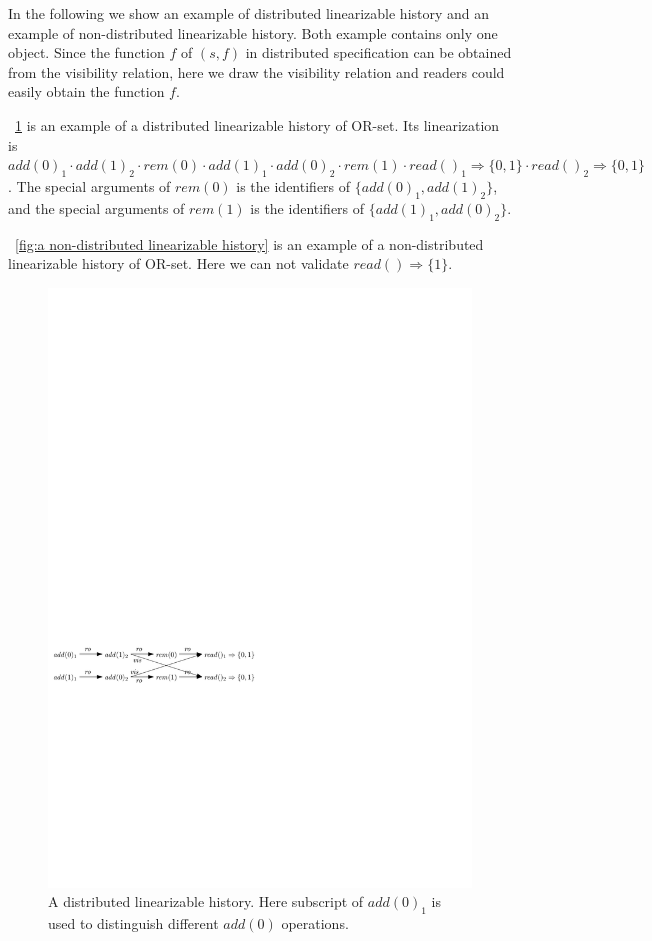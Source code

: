 
In the following we show an example of distributed linearizable history and an example of non-distributed linearizable history. Both example contains only one object. Since the function $f$ of $(s,f)$ in distributed specification can be obtained from the visibility relation, here we draw the visibility relation and readers could easily obtain the function $f$.

\figurename~\ref{fig:a distributed linearizable history} is an example of a distributed linearizable history of OR-set. Its linearization is $\mathit{add}(0)_1 \cdot \mathit{add}(1)_2 \cdot \mathit{rem}(0) \cdot \mathit{add}(1)_1 \cdot \mathit{add}(0)_2 \cdot \mathit{rem}(1) \cdot \mathit{read}()_1 \Rightarrow \{0,1\} \cdot \mathit{read}()_2 \Rightarrow \{0,1\}$. The special arguments of $\mathit{rem}(0)$ is the identifiers of $\{ \mathit{add}(0)_1, \mathit{add}(1)_2 \}$, and the special arguments of $\mathit{rem}(1)$ is the identifiers of $\{ \mathit{add}(1)_1, \mathit{add}(0)_2 \}$.

\figurename~\ref{fig:a non-distributed linearizable history} is an example of a non-distributed linearizable history of OR-set. Here we can not validate $\mathit{read}() \Rightarrow \{ 1 \}$. 

\begin{figure}[t]
  \centering
  \includegraphics[width=0.7 \textwidth]{figures/PIC-Example-LinHis.pdf}
  \caption{A distributed linearizable history. Here subscript of $\mathit{add}(0)_1$ is used to distinguish different $\mathit{add}(0)$ operations.}
  \label{fig:a distributed linearizable history}
\end{figure}



